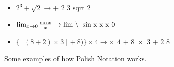 \documentclass{article}
\theoremstyle{plain}
\theoremstyle{definition}
\theoremstyle{algorithm}
\begin{document}
\begin{appendices}
		\begin{figure}
			\centering
			\begin{itemize}
				\item \(2^{3} + \sqrt{2} \rightarrow \text{+ \^{} 2 3 sqrt 2}\) \\
				\item \(\lim_{x \to 0}{\frac{\sin{x}}{x}} \rightarrow \text{lim \textbackslash \: sin x x x 0}\) \\
				\item \(\{[(8 + 2) \times 3] + 8)\} \times 4 \rightarrow \text{$\times$ 4 + 8 $\times$ 3 + 2 8}\) \\
			\end{itemize}
			\caption{Some examples of how Polish Notation works.}
			\label{fig:pn_examples}
		\end{figure}
		
		
	\end{appendices}
	
\end{document}
